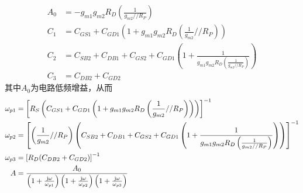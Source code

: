 \documentclass[hyperref, UTF8]{ctexart}
\newcommand{\under}[1]{\frac{1}{#1}}
\newcommand{\J}{{\rm j}}
\begin{document}
    \begin{align*}
        A_0 & = -g_{m1}g_{m2}R_D\left(\under{g_{m2} // R_P}\right) \\
        C_1 & = C_{GS1}+C_{GD1}\left(1+g_{m1}g_{m2}R_D\left(\under{g_{m2}} // R_P\right)\right) \\
        C_2 & = C_{SB2} + C_{DB1} + C_{GS2} + C_{GD1}\left(1+\under{g_{m1}g_{m2}R_D\left(\under{g_{m2} // R_P}\right)}\right) \\
        C_3 & = C_{DB2} + C_{GD2} 
    \end{align*}
    其中$A_0$为电路低频增益，从而
    \begin{align*}
        \omega_{p1} & = \left[ R_S 
            \left( C_{GS1}+C_{GD1}\left(1+g_{m1}g_{m2}R_D\left(\under{g_{m2}} // R_P\right)\right) \right)
            \right] ^ {-1} \\
        \omega_{p2} & = \left[ \left(\under{g_{m2}} // R_P\right)
            \left( C_{SB2} + C_{DB1} + C_{GS2} + C_{GD1}\left(1+\under{g_{m1}g_{m2}R_D\left(\under{g_{m2} // R_P}\right)}\right) \right)
            \right] ^ {-1}\\
        \omega_{p3} & = \left[ R_D
            (C_{DB2} + C_{GD2})
            \right] ^ {-1}\\
        A & = \frac{A_0}{
            \left( 1 + \frac{\J \omega}{\omega_{p1}}
            \right)
            \left( 1 + \frac{\J \omega}{\omega_{p2}} \right)
            \left( 1 + \frac{\J \omega}{\omega_{p3}} \right)
        }
    \end{align*}
\end{document}
